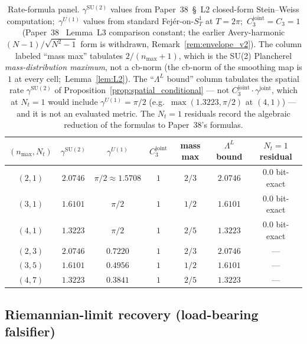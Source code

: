 \documentclass[11pt,a4paper]{article}
\theoremstyle{plain}
\theoremstyle{definition}
\newcommand{\nmax}{n_{\max}}
\newcommand{\Nt}{N_{t}}
\newcommand{\SoneT}{S^{1}_{T}}
\newcommand{\SU}{\mathrm{SU}}
\newcommand{\Uone}{U(1)}
\newcommand{\Lprop}{\Lambda^{L}}
\newcommand{\gammajoint}{\gamma^{\mathrm{joint}}}
\newcommand{\gammaSU}{\gamma^{\SU(2)}}
\newcommand{\gammaU}{\gamma^{\Uone}}
\newcommand{\Cthreejoint}{C_{3}^{\mathrm{joint}}}
\begin{document}
\begin{table}[t]
\centering
\renewcommand{\arraystretch}{1.2}
\begin{tabular}{c|c|c|c|c|c|c}
\toprule
$(\nmax, \Nt)$ & $\gammaSU$ & $\gammaU$ & $\Cthreejoint$ & mass max
   & $\Lprop$ bound & $\Nt = 1$ residual \\
\midrule
$(2, 1)$ & $2.0746$ & $\pi/2 \approx 1.5708$  & $1$ & $2/3$ & $2.0746$ & $\mathbf{0.0}$ bit-exact \\
$(3, 1)$ & $1.6101$ & $\pi/2$                  & $1$ & $1/2$ & $1.6101$ & $\mathbf{0.0}$ bit-exact \\
$(4, 1)$ & $1.3223$ & $\pi/2$                  & $1$ & $2/5$ & $1.3223$ & $\mathbf{0.0}$ bit-exact \\
$(2, 3)$ & $2.0746$ & $0.7220$                 & $1$ & $2/3$ & $2.0746$ & --- \\
$(3, 5)$ & $1.6101$ & $0.4956$                 & $1$ & $1/2$ & $1.6101$ & --- \\
$(4, 7)$ & $1.3223$ & $0.3841$                 & $1$ & $2/5$ & $1.3223$ & --- \\
\bottomrule
\end{tabular}
\caption{Rate-formula panel.
$\gammaSU$ values from Paper~38~\S~L2 closed-form Stein--Weiss
computation;\ $\gammaU$ values from standard Fej\'er-on-$\SoneT$ at
$T = 2\pi$;\ $\Cthreejoint = C_{3} = 1$ (Paper~38~\cite{paper38} Lemma~L3
comparison constant; the earlier Avery-harmonic $(N-1)/\sqrt{N^{2}-1}$ form
is withdrawn, Remark~\ref{rem:envelope_v2}). The column labeled ``mass max'' tabulates
$2/(\nmax+1)$, which is the SU(2) Plancherel \emph{mass-distribution
maximum}, not a cb-norm (the cb-norm of the smoothing map is $1$ at
every cell;\ Lemma~\ref{lem:L2}). The ``$\Lprop$ bound'' column
tabulates the spatial rate $\gammaSU$ of
Proposition~\ref{prop:spatial_conditional} --- not
$\Cthreejoint\cdot\gammajoint$, which at $\Nt = 1$ would include
$\gammaU = \pi/2$ (e.g.\ $\max(1.3223, \pi/2)$ at $(4,1)$) --- and it is
not an evaluated metric. The $\Nt = 1$ residuals record the algebraic reduction of the
formulas to Paper~38's formulas.}\label{tab:panel}
\end{table}

\subsection{Riemannian-limit recovery (load-bearing falsifier)}
\label{sec:riemannian_limit}
\end{document}

